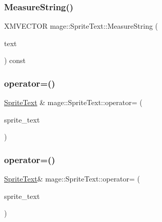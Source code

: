 \subsubsection{\texorpdfstring{Measure\+String()}{MeasureString()}}
{\footnotesize\ttfamily X\+M\+V\+E\+C\+T\+OR mage\+::\+Sprite\+Text\+::\+Measure\+String (\begin{DoxyParamCaption}\item[{const wchar\+\_\+t $\ast$}]{text }\end{DoxyParamCaption}) const}

\hypertarget{classmage_1_1_sprite_text_acc41212e9847babd95afa68aedf2ad42}{}\label{classmage_1_1_sprite_text_acc41212e9847babd95afa68aedf2ad42} 
\subsubsection{\texorpdfstring{operator=()}{operator=()}\hspace{0.1cm}{\footnotesize\ttfamily [1/2]}}
{\footnotesize\ttfamily \hyperlink{classmage_1_1_sprite_text}{Sprite\+Text} \& mage\+::\+Sprite\+Text\+::operator= (\begin{DoxyParamCaption}\item[{const \hyperlink{classmage_1_1_sprite_text}{Sprite\+Text} \&}]{sprite\+\_\+text }\end{DoxyParamCaption})}

\hypertarget{classmage_1_1_sprite_text_a48e9d2fdda8bf2f8847a425444df980c}{}\label{classmage_1_1_sprite_text_a48e9d2fdda8bf2f8847a425444df980c} 
\subsubsection{\texorpdfstring{operator=()}{operator=()}\hspace{0.1cm}{\footnotesize\ttfamily [2/2]}}
{\footnotesize\ttfamily \hyperlink{classmage_1_1_sprite_text}{Sprite\+Text}\& mage\+::\+Sprite\+Text\+::operator= (\begin{DoxyParamCaption}\item[{\hyperlink{classmage_1_1_sprite_text}{Sprite\+Text} \&\&}]{sprite\+\_\+text }\end{DoxyParamCaption})\hspace{0.3cm}{\ttfamily [default]}}

